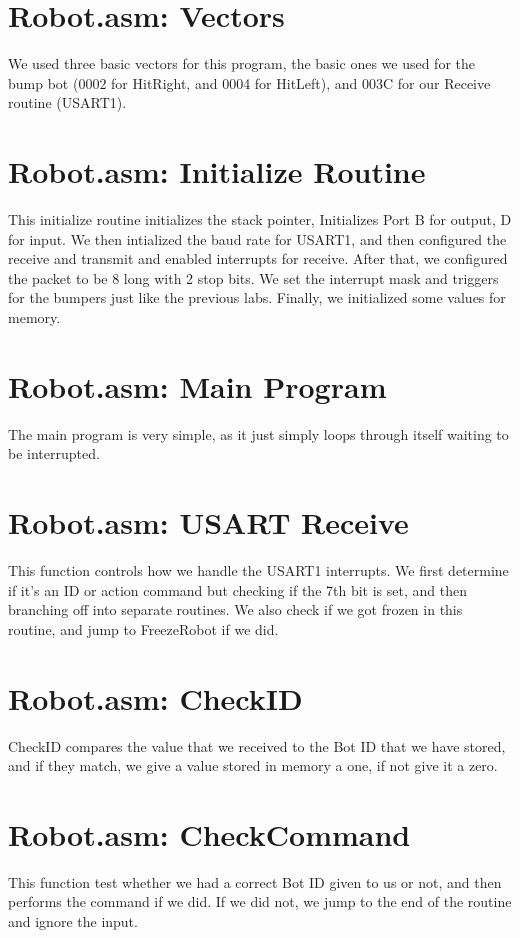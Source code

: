 \documentclass[12pt,letterpaper]{article}
\begin{document}
\section{Robot.asm: Vectors}
We used three basic vectors for this program, the basic ones we used for the bump bot (0002 for HitRight, and 0004 for HitLeft), and 003C for our Receive routine 
(USART1).

\section{Robot.asm: Initialize Routine}
This initialize routine initializes the stack pointer, Initializes Port B for output, D for input. We then intialized the baud rate for USART1, and then configured 
the receive and transmit and enabled interrupts for receive. After that, we configured the packet to be 8 long with 2 stop bits. We set the interrupt mask and triggers 
for the bumpers just like the previous labs. Finally, we initialized some values for memory.

\section{Robot.asm: Main Program}
The main program is very simple, as it just simply loops through itself waiting to be interrupted.

\section{Robot.asm: USART Receive}
This function controls how we handle the USART1 interrupts. We first determine if it's an ID or action command but checking if the 7th bit is set, and then branching 
off into separate routines. We also check if we got frozen in this routine, and jump to FreezeRobot if we did.

\section{Robot.asm: CheckID}
CheckID compares the value that we received to the Bot ID that we have stored, and if they match, we give a value stored in memory a one, if not give it a zero.

\section{Robot.asm: CheckCommand}
This function test whether we had a correct Bot ID given to us or not, and then performs the command if we did. If we did not, we jump to the end of the routine and 
ignore the input.
\end{document}
